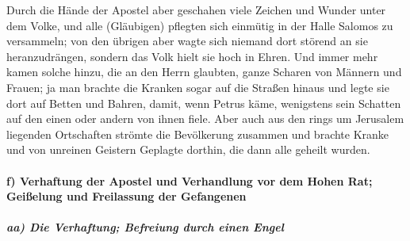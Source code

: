  Durch die Hände der Apostel aber geschahen viele Zeichen
und Wunder unter dem Volke, und alle (Gläubigen) pflegten sich einmütig
in der Halle Salomos zu versammeln;  von den übrigen aber
wagte sich niemand dort störend an sie heranzudrängen, sondern das Volk
hielt sie hoch in Ehren.  Und immer mehr kamen solche
hinzu, die an den Herrn glaubten, ganze Scharen von Männern und Frauen;
 ja man brachte die Kranken sogar auf die Straßen hinaus
und legte sie dort auf Betten und Bahren, damit, wenn Petrus käme,
wenigstens sein Schatten auf den einen oder andern von ihnen fiele.
 Aber auch aus den rings um Jerusalem liegenden
Ortschaften strömte die Bevölkerung zusammen und brachte Kranke und von
unreinen Geistern Geplagte dorthin, die dann alle geheilt wurden.

\hypertarget{f-verhaftung-der-apostel-und-verhandlung-vor-dem-hohen-rat-geiuxdfelung-und-freilassung-der-gefangenen}{%
\paragraph{f) Verhaftung der Apostel und Verhandlung vor dem Hohen Rat;
Geißelung und Freilassung der
Gefangenen}\label{f-verhaftung-der-apostel-und-verhandlung-vor-dem-hohen-rat-geiuxdfelung-und-freilassung-der-gefangenen}}

\hypertarget{aa-die-verhaftung-befreiung-durch-einen-engel}{%
\subparagraph{aa) Die Verhaftung; Befreiung durch einen
Engel}\label{aa-die-verhaftung-befreiung-durch-einen-engel}}


